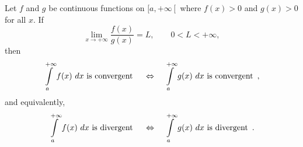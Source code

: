 \begin{theorem}\label{thm:impint_limit}

		Let $f$ and $g$ be continuous functions on $[a,+\infty\left[\right.$ where $f(x)>0$ and $g(x)>0$ for all $x$. If $$\lim_{x\to+\infty} \frac{f(x)}{g(x)} = L,\qquad 0<L<+\infty,$$
	then 
	$$\displaystyle \int\limits_a^{+\infty} f(x)\ dx \text{ is convergent } \quad \Leftrightarrow \quad  \displaystyle \int\limits_a^{+\infty} g(x)\ dx \text{ is convergent }\,, $$ 
	and equivalently,
	$$\displaystyle \int\limits_a^{+\infty} f(x)\ dx \text{ is divergent } \quad \Leftrightarrow \quad  \displaystyle \int\limits_a^{+\infty} g(x)\ dx \text{ is divergent }\,. $$ 
\end{theorem}

\ifanalysis

